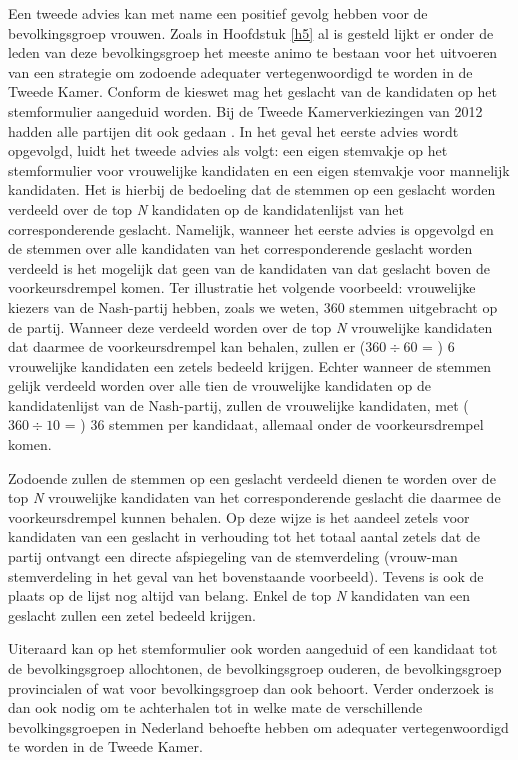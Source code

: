 Een tweede advies kan met name een positief gevolg hebben voor de bevolkingsgroep vrouwen. Zoals in Hoofdstuk \ref{h5} al is gesteld lijkt er onder de leden van deze bevolkingsgroep het meeste animo te bestaan voor het uitvoeren van een strategie om zodoende adequater vertegenwoordigd te worden in de Tweede Kamer. Conform de kieswet \citeyearpar{kieswetje} mag het geslacht van de kandidaten op het stemformulier aangeduid worden. Bij de Tweede Kamerverkiezingen van 2012 hadden alle partijen dit ook gedaan \citep{Kiesraad_kandidatenlijsten}. In het geval het eerste advies wordt opgevolgd, luidt het tweede advies als volgt: een eigen stemvakje op het stemformulier voor vrouwelijke kandidaten en een eigen stemvakje voor mannelijk kandidaten. Het is hierbij de bedoeling dat de stemmen op een geslacht worden verdeeld over de top \textit{N} kandidaten op de kandidatenlijst van het corresponderende geslacht. Namelijk, wanneer het eerste advies is opgevolgd en de stemmen over alle kandidaten van het corresponderende geslacht worden verdeeld is het mogelijk dat geen van de kandidaten van dat geslacht boven de voorkeursdrempel komen. Ter illustratie het volgende voorbeeld: vrouwelijke kiezers van de Nash-partij hebben, zoals we weten, 360 stemmen uitgebracht op de partij. Wanneer deze verdeeld worden over de top \textit{N} vrouwelijke kandidaten dat daarmee de voorkeursdrempel kan behalen, zullen er ($360\div60$ = ) 6 vrouwelijke kandidaten een zetels bedeeld krijgen. Echter wanneer de stemmen gelijk verdeeld worden over alle tien de vrouwelijke kandidaten op de kandidatenlijst van de Nash-partij, zullen de vrouwelijke kandidaten, met ($360\div10$ = ) 36 stemmen per kandidaat, allemaal onder de voorkeursdrempel komen. 

Zodoende zullen de stemmen op een geslacht verdeeld dienen te worden over de top \textit{N} vrouwelijke kandidaten van het corresponderende geslacht die daarmee de voorkeursdrempel kunnen behalen. Op deze wijze is het aandeel zetels voor kandidaten van een geslacht in verhouding tot het totaal aantal zetels dat de partij ontvangt een directe afspiegeling van de stemverdeling (vrouw-man stemverdeling in het geval van het bovenstaande voorbeeld). Tevens is ook de plaats op de lijst nog altijd van belang. Enkel de top \textit{N} kandidaten van een geslacht zullen een zetel bedeeld krijgen.  

Uiteraard kan op het stemformulier ook worden aangeduid of een kandidaat tot de bevolkingsgroep allochtonen, de bevolkingsgroep ouderen, de bevolkingsgroep provincialen of wat voor bevolkingsgroep dan ook behoort. Verder onderzoek is dan ook nodig om te achterhalen tot in welke mate de verschillende bevolkingsgroepen in Nederland behoefte hebben om adequater vertegenwoordigd te worden in de Tweede Kamer. 


